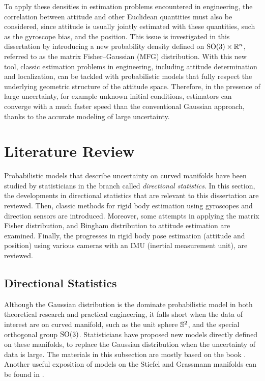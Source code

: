 To apply these densities in estimation problems encountered in engineering, the correlation between attitude and other Euclidean quantities must also be considered, since attitude is usually jointly estimated with these quantities, such as the gyroscope bias, and the position.
This issue is investigated in this dissertation by introducing a new probability density defined on $\mathrm{SO}(3) \times \mathbb{R}^n$, referred to as the matrix Fisher--Gaussian (MFG) distribution.
With this new tool, classic estimation problems in engineering, including attitude determination and localization, can be tackled with probabilistic models that fully respect the underlying geometric structure of the attitude space.
Therefore, in the presence of large uncertainty, for example unknown initial conditions, estimators can converge with a much faster speed than the conventional Gaussian approach, thanks to the accurate modeling of large uncertainty.

\section{Literature Review}

Probabilistic models that describe uncertainty on curved manifolds have been studied by statisticians in the branch called \textit{directional statistics}.
In this section, the developments in directional statistics that are relevant to this dissertation are reviewed.
Then, classic methods for rigid body estimation using gyroscopes and direction sensors are introduced.
Moreover, some attempts in applying the matrix Fisher distribution, and Bingham distribution to attitude estimation are examined.
Finally, the progresses in rigid body pose estimation (attitude and position) using various cameras with an IMU (inertial measurement unit), are reviewed.

\subsection{Directional Statistics} \label{section:intro-review-direction}

Although the Gaussian distribution is the dominate probabilistic model in both theoretical research and practical engineering, it falls short when the data of interest are on curved manifold, such as the unit sphere $\mathbb{S}^2$, and the special orthogonal group $\mathrm{SO}(3)$.
Statisticians have proposed new models directly defined on these manifolds, to replace the Gaussian distribution when the uncertainty of data is large.
The materials in this subsection are mostly based on the book \cite{mardia2009directional}.
Another useful exposition of models on the Stiefel and Grassmann manifolds can be found in \cite{chikuse2003statistics}.

